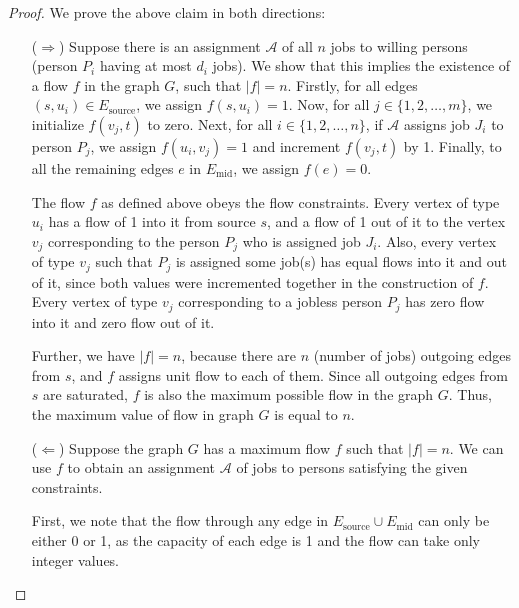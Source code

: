 \documentclass[11pt, fleqn]{article}
\begin{document}
\begin{proof}
We prove the above claim in both directions:
\begin{itemize}
    \item[($\Rightarrow$)]
    Suppose there is an assignment $\mathcal{A}$ of all $n$ jobs to willing persons (person $P_i$ having at most $d_i$ jobs). We show that this implies the existence of a flow $f$ in the graph $G$, such that $|f| = n$. Firstly, for all edges $(s,u_i)\in E_{\text{source}}$, we assign $f(s,u_i)=1$. Now, for all $j\in\{1,2,\dots,m\}$, we initialize $f(v_j,t)$ to zero. Next, for all $i\in\{1,2,\dots,n\}$, if $\mathcal{A}$ assigns job $J_i$ to person $P_j$, we assign $f(u_i,v_j)=1$ and increment $f(v_j,t)$ by 1. Finally, to all the remaining edges $e$ in $E_{\text{mid}}$, we assign $f(e)=0$.
    
    The flow $f$ as defined above obeys the flow constraints. Every vertex of type $u_i$ has a flow of 1 into it from source $s$, and a flow of 1 out of it to the vertex $v_j$ corresponding to the person $P_j$ who is assigned job $J_i$. Also, every vertex of type $v_j$ such that $P_j$ is assigned some job(s) has equal flows into it and out of it, since both values were incremented together in the construction of $f$. Every vertex of type $v_j$ corresponding to a jobless person $P_j$ has zero flow into it and zero flow out of it.
    
    Further, we have $|f|=n$, because there are $n$ (number of jobs) outgoing edges from $s$, and $f$ assigns unit flow to each of them. Since all outgoing edges from $s$ are saturated, $f$ is also the maximum possible flow in the graph $G$. Thus, the maximum value of flow in graph $G$ is equal to $n$.
    
    \item[($\Leftarrow$)]
    Suppose the graph $G$ has a maximum flow $f$ such that $|f|=n$. We can use $f$ to obtain an assignment $\mathcal{A}$ of jobs to persons satisfying the given constraints.
    
    First, we note that the flow through any edge in $E_{\text{source}}\cup E_{\text{mid}}$ can only be either 0 or 1, as the capacity of each edge is 1 and the flow can take only integer values.
    

\end{itemize}
\end{proof}
\end{document}
